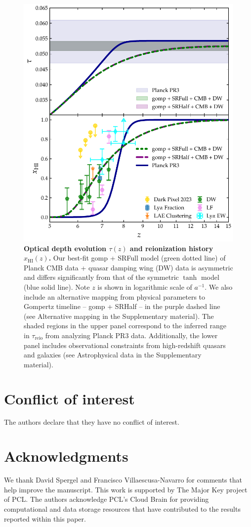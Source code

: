 \documentclass[12pt]{article}
\newcommand{\HI}{\mathrm{HI}}
\newcommand{\reio}{\mathrm{reio}}
\begin{document}
\begin{figure}
\centering
\includegraphics[width=0.6\linewidth]{figs/FIG4.pdf}
\caption{\textbf{\boldmath Optical depth evolution $\tau(z)$ and reionization
history $x_\HI(z)$.}
Our best-fit gomp + SRFull model (green dotted line) of Planck CMB data
+ quasar damping wing (DW) data is asymmetric and differs significantly
from that of the symmetric $\tanh$ model (blue solid line).
Note $z$ is shown in logarithmic scale of $a^{-1}$.
We also include an alternative mapping from physical parameters to
Gompertz timeline -- gomp + SRHalf -- in the purple dashed line (see
Alternative mapping in the Supplementary material).
The shaded regions in the upper panel correspond to the inferred range
in $\tau_\reio$ from analyzing Planck PR3 data.
Additionally, the lower panel includes observational constraints from
high-redshift quasars and galaxies (see Astrophysical data in
the Supplementary material).}
\label{fig:history} \end{figure}



\clearpage  %

\section*{Conflict of interest}
The authors declare that they have no conflict of interest. 

\section*{Acknowledgments}
We thank David Spergel and Francisco Villaescusa-Navarro for comments
that help improve the manuscript.
This work is supported by The Major Key project of PCL.
The authors acknowledge PCL's Cloud Brain for providing computational
and data storage resources that have contributed to the results reported
within this paper.
\end{document}
